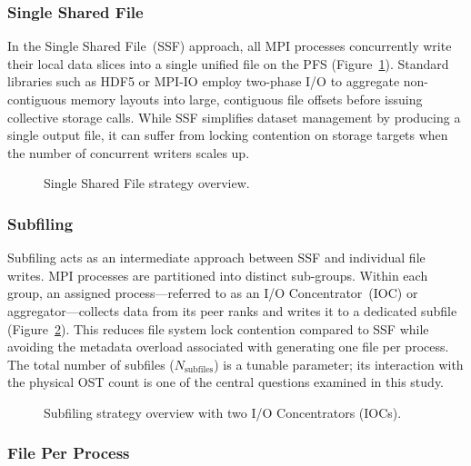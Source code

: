 \subsubsection{Single Shared File}
\label{sec:ssf}

In the Single Shared File~(SSF) approach, all MPI processes concurrently write
their local data slices into a single unified file on the PFS
(Figure~\ref{fig:ssf_schema}). Standard libraries such as HDF5 or MPI-IO employ
two-phase I/O to aggregate non-contiguous memory layouts into large, contiguous
file offsets before issuing collective storage calls. While SSF simplifies dataset
management by producing a single output file, it can suffer from locking contention
on storage targets when the number of concurrent writers scales up.

\begin{figure}[h]
  \centering
  
  \caption{Single Shared File strategy overview.}
  \label{fig:ssf_schema}
\end{figure}

\subsubsection{Subfiling}
\label{sec:subfiling}

Subfiling acts as an intermediate approach between SSF and individual file writes.
MPI processes are partitioned into distinct sub-groups. Within each group, an
assigned process---referred to as an I/O Concentrator~(IOC) or aggregator---collects
data from its peer ranks and writes it to a dedicated subfile
(Figure~\ref{fig:subfiling_schema}). This reduces file system lock contention
compared to SSF while avoiding the metadata overload associated with generating one
file per process. The total number of subfiles ($N_{\text{subfiles}}$) is a tunable
parameter; its interaction with the physical OST count is one of the central
questions examined in this study.

\begin{figure}[htbp]
  \centering
  
  \caption{Subfiling strategy overview with two I/O Concentrators (IOCs).}
  \label{fig:subfiling_schema}
\end{figure}

\FloatBarrier
\subsubsection{File Per Process}
\label{sec:fpp}

